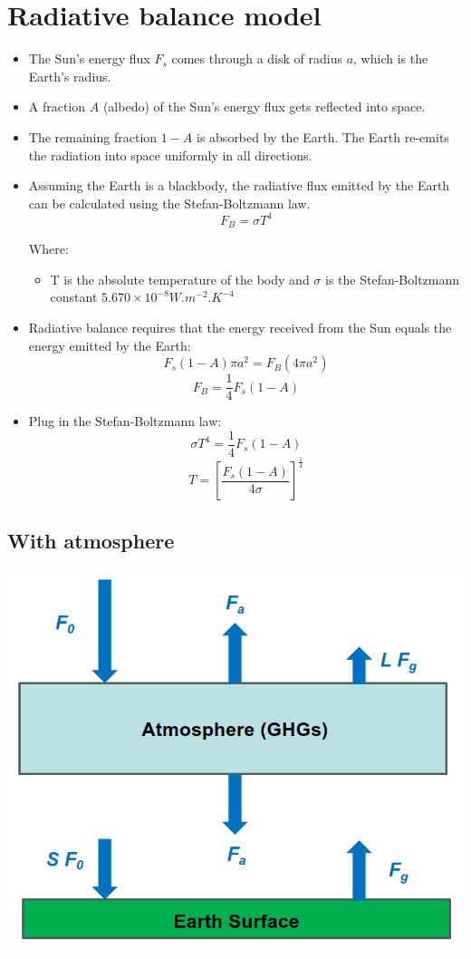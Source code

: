 \documentclass[11pt]{article}
\begin{document}
\newpage

\section{Radiative balance model}
\label{sec:orga9f7cf9}
\begin{itemize}
\item The Sun's energy flux \(F_{s}\) comes through a disk of radius \(a\), which is the Earth's radius.
\item A fraction \(A\) (albedo) of the Sun's energy flux gets reflected into space.
\item The remaining fraction \(1-A\) is absorbed by the Earth. The Earth re-emits the radiation into space uniformly in all directions.
\item Assuming the Earth is a blackbody, the radiative flux emitted by the Earth can be calculated using the Stefan-Boltzmann law.
\[F_B = \sigma T^4\]

Where:
\begin{itemize}
\item T is the absolute temperature of the body and \(\sigma\) is the Stefan-Boltzmann constant \(5.670 \times 10^{-8} \unit{W.m^{-2}.K^{-4}}\)
\end{itemize}

\item Radiative balance requires that the energy received from the Sun equals the energy emitted by the Earth:
\[F_s (1-A) \pi a^2 = F_B (4 \pi a^2)\]
\[F_B = \frac{1}{4} F_s(1-A)\]

\item Plug in the Stefan-Boltzmann law:
\[\sigma T^4 = \frac{1}{4} F_s (1-A)\]
\[T = \left[ \frac{F_s(1-A)}{4 \sigma} \right] ^{\frac{1}{4}}\]
\end{itemize}

\subsection{With atmosphere}
\label{sec:org692b341}

\begin{center}
\includegraphics[scale=0.6]{./images/radiative-balance-model-with-atmosphere.png}
\end{center}
\end{document}
